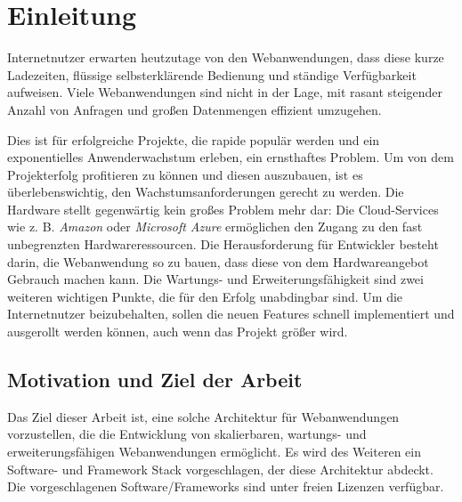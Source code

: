\chapter{Einleitung}

Internetnutzer erwarten heutzutage von den Webanwendungen, dass diese kurze Ladezeiten, flüssige selbsterklärende Bedienung und ständige Verfügbarkeit aufweisen. Viele Webanwendungen sind nicht in der Lage, mit rasant steigender Anzahl von Anfragen und großen Datenmengen effizient umzugehen.

Dies ist für erfolgreiche Projekte, die rapide populär werden und ein exponentielles Anwenderwachstum erleben, ein ernsthaftes Problem. Um von dem Projekterfolg profitieren zu können und diesen auszubauen, ist es überlebenswichtig, den Wachstumsanforderungen gerecht zu werden. Die Hardware stellt gegenwärtig kein großes Problem mehr dar: Die Cloud-Services wie z. B. \textit{Amazon} oder \textit{Microsoft Azure} ermöglichen den Zugang zu den fast unbegrenzten Hardwareressourcen. Die Herausforderung für Entwickler besteht darin, die Webanwendung so zu bauen, dass diese von dem Hardwareangebot Gebrauch machen kann. Die Wartungs- und Erweiterungsfähigkeit sind zwei weiteren wichtigen Punkte, die für den Erfolg unabdingbar sind. Um die Internetnutzer beizubehalten, sollen die neuen Features schnell implementiert und ausgerollt werden können, auch wenn das Projekt größer wird.

\section{Motivation und Ziel der Arbeit}

Das Ziel dieser Arbeit ist, eine solche Architektur für Webanwendungen vorzustellen, die die Entwicklung von skalierbaren, wartungs- und erweiterungsfähigen Webanwendungen ermöglicht. Es wird des Weiteren ein Software-  und Framework Stack vorgeschlagen, der diese Architektur abdeckt. Die vorgeschlagenen Software/Frameworks sind unter freien Lizenzen verfügbar.

